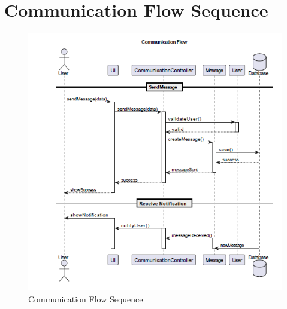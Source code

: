 \documentclass[12pt,a4paper]{report}
\begin{document}
\section{Communication Flow Sequence}
\begin{figure}[htbp]
    \centering
    \includegraphics[width=1\textwidth]{communication-flow-sequence.png}
    \caption{Communication Flow Sequence}
    \label{fig:communication-flow-sequence}
\end{figure}
\end{document}
